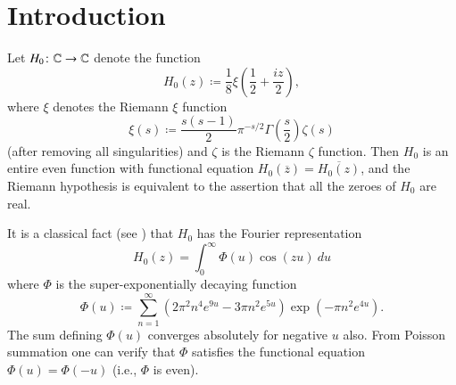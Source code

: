 \section{Introduction}

Let $H_0 \colon \mathbb{C} \to \mathbb{C}$ denote the function
\begin{equation}\label{hoz}
 H_0(z) \coloneqq \frac{1}{8} \xi\left(\frac{1}{2} + \frac{iz}{2}\right),
\end{equation}
where $\xi$ denotes the Riemann $\xi$ function
\begin{equation}\label{sas}
 \xi(s) \coloneqq \frac{s(s-1)}{2} \pi^{-s/2} \Gamma\left(\frac{s}{2}\right) \zeta(s)
\end{equation}
(after removing all singularities) and $\zeta$ is the Riemann $\zeta$ function.
Then $H_0$ is an entire even function with functional equation $H_0(\overline{z}) = \overline{H_0(z)}$, and the Riemann hypothesis is equivalent to the assertion that all the zeroes of $H_0$ are real.

It is a classical fact (see \cite[p. 255]{titch}) that $H_0$ has the Fourier representation
$$ H_0(z) = \int_0^\infty \Phi(u) \cos(zu)\ du$$
where $\Phi$ is the super-exponentially decaying function
\begin{equation}\label{phidef}
 \Phi(u) \coloneqq \sum_{n=1}^\infty (2\pi^2  n^4 e^{9u} - 3\pi n^2 e^{5u} ) \exp(-\pi n^2 e^{4u} ).
\end{equation}
The sum defining $\Phi(u)$ converges absolutely for negative $u$ also.  From Poisson summation one can verify that $\Phi$ satisfies the functional equation $\Phi(u) = \Phi(-u)$ (i.e., $\Phi$ is even). 

